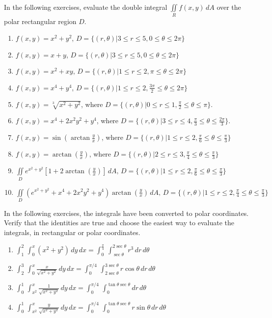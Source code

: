 \documentclass{exercises}
\begin{document}
In the following exercises, evaluate the double integral $\underset{R}{\iint}f(x,y)\,dA$ over the polar rectangular region $D$.

\begin{enumerate}[resume]
\item $f(x,y)=x^{2}+y^{2}$, $D=\{(r,\theta)|3\le r\le5,0\le \theta \le2\pi \}$
\item $f(x,y)=x+y$, $D=\{(r,\theta)|3\le r\le5,0\le \theta \le2\pi \}$
\item $f(x,y)=x^{2}+xy$, $D=\{(r,\theta)|1\le r\le2,\pi \le \theta \le2\pi \}$
\item $f(x,y)=x^{4}+y^{4}$, $D=\{(r,\theta)|1\le r\le2,\frac{3\pi}{2}\le \theta \le2\pi \}$
\item $f(x,y)=\sqrt[3]{x^{2}+y^{2}}$, where $D=\{(r,\theta)|0\le r\le1,\frac{\pi}{2}\le \theta \le \pi \}$.
\item $f(x,y)=x^{4}+2x^{2}y^{2}+y^{4}$, where $D=\{(r,\theta)|3\le r\le4,\frac{\pi}{3}\le \theta \le \frac{2\pi}{3}\}$.
\item $f(x,y)=\sin(\arctan \frac{y}{x})$, where $D=\{(r,\theta)|1\le r\le2,\frac{\pi}{6}\le \theta \le \frac{\pi}{3}\}$
\item $f(x,y)=\arctan(\frac{y}{x})$, where $D=\{(r,\theta)|2\le r\le3,\frac{\pi}{4}\le \theta \le \frac{\pi}{3}\}$
\item $\underset{D}{\iint}e^{x^{2}+y^{2}}[1+2\arctan(\frac{y}{x})]\,dA,\,D=\{(r,\theta)|1\le r\le2,\frac{\pi}{6}\le \theta \le \frac{\pi}{3}\}$
\item $\underset{D}{\iint}(e^{x^{2}+y^{2}}+x^{4}+2x^{2}y^{2}+y^{4})\arctan(\frac{y}{x})\,dA,\,D=\{(r,\theta)|1\le r\le2,\frac{\pi}{4}\le \theta \le \frac{\pi}{3}\}$
\end{enumerate}

In the following exercises, the integrals have been converted to polar coordinates. Verify that the identities are true and choose the easiest way to evaluate the integrals, in rectangular or polar coordinates.

\begin{enumerate}[resume]
\item $\int_{1}^{2}\,\int_{0}^{x}(x^{2}+y^{2})\,dy\,dx=\int_{0}^{\frac{\pi}{4}}\,\int_{\sec \theta}^{2\sec \theta}r^{3}\,dr\,d\theta$
\item $\int_{2}^{3}\,\int_{0}^{x}\frac{x}{\sqrt{x^{2}+y^{2}}}\,dy\,dx=\int_{0}^{\pi/4}\,\int_{2\sec \theta}^{3\sec \theta}r\cos \theta \,dr\,d\theta$
\item $\int_{0}^{1}\,\int_{x^{2}}^{x}\frac{1}{\sqrt{x^{2}+y^{2}}}\,dy\,dx=\int_{0}^{\pi/4}\,\int_{0}^{\tan \theta \sec \theta}dr\,d\theta$
\item $\int_{0}^{1}\,\int_{x^{2}}^{x}\frac{y}{\sqrt{x^{2}+y^{2}}}\,dy\,dx=\int_{0}^{\pi/4}\,\int_{0}^{\tan \theta \sec \theta}r\sin \theta \,dr\,d\theta$
\end{enumerate}
\end{document}
